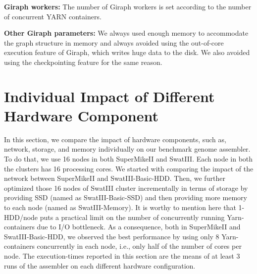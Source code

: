 \documentclass[conference]{IEEEtran}
\begin{document}
\textbf{Giraph workers:} The number of Giraph workers is set according to the number of concurrent YARN containers.

\textbf{Other Giraph parameters:} We always used enough memory to accommodate the graph structure in memory and always avoided using the out-of-core execution feature of Giraph, which writes huge data to the disk. We also avoided using the checkpointing feature for the same reason.

\section {Individual Impact of Different Hardware Component} \label{IndividualImpactofDifferentHardwareConfiguration}
In this section, we compare the impact of hardware components, such as, network, storage, and memory individually on our benchmark genome assembler.
To do that, we use 16 nodes in both SuperMikeII and SwatIII. Each node in both the clusters has 16 processing cores.
We started with comparing the impact of the network between SuperMikeII and SwatIII-Basic-HDD.
Then, we further optimized those 16 nodes of SwatIII cluster incrementally in terms of storage by providing SSD (named as SwatIII-Basic-SSD) and then providing more memory to each node (named as SwatIII-Memory).
It is worthy to mention here that 1-HDD/node puts a practical limit on the number of concurrently running Yarn-containers due to I/O bottleneck.
As a consequence, both in SuperMikeII and SwatIII-Basic-HDD, we observed the best performance by using only 8 Yarn-containers concurrently in each node, i.e., only half of the number of cores per node.
The execution-times reported in this section are the means of at least 3 runs of the assembler on each different hardware configuration.
\label{IndividualHWEffect}
\end{document}
